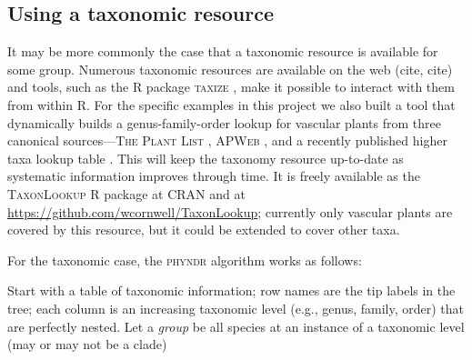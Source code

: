 \documentclass[a4paper,11pt]{article}
\begin{document}
\subsection{Using a taxonomic resource}

It may be more commonly the case that a taxonomic resource is available for some group. Numerous taxonomic resources are available on the web (cite, cite) and tools, such as the R package \textsc{taxize} \citep{taxize}, make it possible to interact with them from within R. For the specific examples in this project we also built a tool that dynamically builds a genus-family-order lookup for vascular plants from three canonical sources---\textsc{The Plant List} \citep{ThePlantList}, \textsc{APWeb} \citep{apweb}, and a recently published higher taxa lookup table \citep[][compiled by D.C. Tank, J.M. Eastman, J.M. Beaulieu, W.K. Cornwell, P.F. Stevens, and A.E. Zanne]{ZanneDryad}.  This will keep the taxonomy resource up-to-date as systematic information improves through time.  It is freely available as the \textsc{TaxonLookup} R package at CRAN and at \url{https://github.com/wcornwell/TaxonLookup}; currently only vascular plants are covered by this resource, but it could be extended to cover other taxa. 

For the taxonomic case, the \textsc{phyndr} algorithm works as follows:

Start with a table of taxonomic information; row names are the tip labels in the tree; each column is an increasing taxonomic level (e.g., genus, family, order) that are perfectly nested.  Let a \emph{group} be all species at an instance of a taxonomic level (may or may not be a clade)
\end{document}
